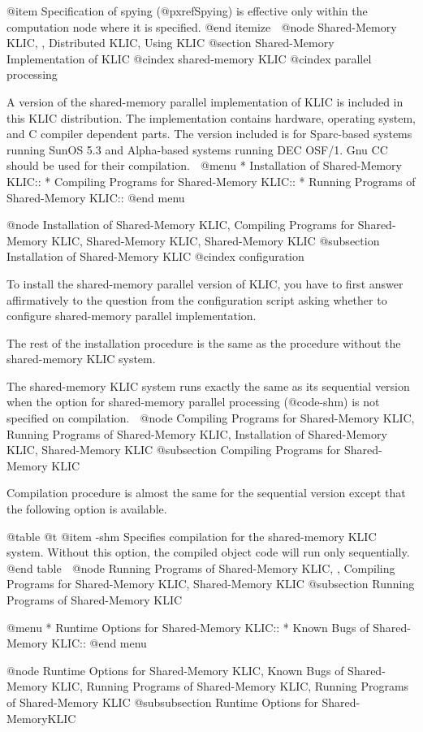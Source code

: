 {{{{@item
Specification of spying (@pxref{Spying}) is effective only within the
computation node where it is specified.
@end itemize

@node Shared-Memory KLIC,  , Distributed KLIC, Using KLIC
@section Shared-Memory Implementation of KLIC 
@cindex shared-memory KLIC
@cindex parallel processing

A version of the shared-memory parallel implementation of KLIC is
included in this KLIC distribution.  The implementation contains
hardware, operating system, and C compiler dependent parts.  The version
included is for Sparc-based systems running SunOS 5.3 and Alpha-based
systems running DEC OSF/1.  Gnu CC should be used for their compilation.

@menu
* Installation of Shared-Memory KLIC::  
* Compiling Programs for Shared-Memory KLIC::  
* Running Programs of Shared-Memory KLIC::  
@end menu

@node Installation of Shared-Memory KLIC, Compiling Programs for Shared-Memory KLIC, Shared-Memory KLIC, Shared-Memory KLIC
@subsection Installation of Shared-Memory KLIC
@cindex configuration

To install the shared-memory parallel version of KLIC, you have to first
answer affirmatively to the question from the configuration script
asking whether to configure shared-memory parallel implementation.

The rest of the installation procedure is the same as the procedure
without the shared-memory KLIC system.

The shared-memory KLIC system runs exactly the same as its sequential
version when the option for shared-memory parallel processing
(@code{-shm}) is not specified on compilation.

@node Compiling Programs for Shared-Memory KLIC, Running Programs of Shared-Memory KLIC, Installation of Shared-Memory KLIC, Shared-Memory KLIC
@subsection Compiling Programs for Shared-Memory KLIC

Compilation procedure is almost the same for the sequential version
except that the following option is available.

@table @t
@item -shm
Specifies compilation for the shared-memory KLIC system.  Without this
option, the compiled object code will run only sequentially.
@end table

@node Running Programs of Shared-Memory KLIC,  , Compiling Programs for Shared-Memory KLIC, Shared-Memory KLIC
@subsection Running Programs of Shared-Memory KLIC

@menu
* Runtime Options for Shared-Memory KLIC::  
* Known Bugs of Shared-Memory KLIC::  
@end menu

@node Runtime Options for Shared-Memory KLIC, Known Bugs of Shared-Memory KLIC, Running Programs of Shared-Memory KLIC, Running Programs of Shared-Memory KLIC
@subsubsection Runtime Options for Shared-MemoryKLIC

}}}}
